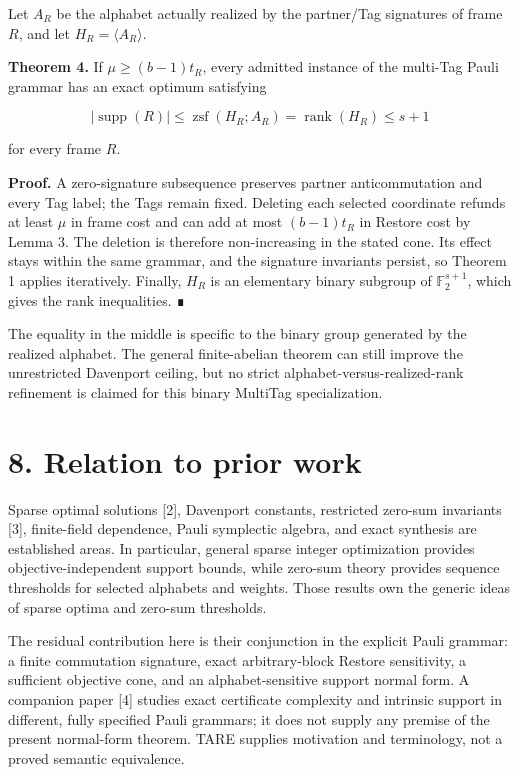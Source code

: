 \documentclass[
  11pt,
]{article}
\begin{document}
Let \(A_R\) be the alphabet actually realized by the partner/Tag
signatures of frame \(R\), and let \(H_R=\langle A_R\rangle\).

\textbf{Theorem 4.} If \(\mu\ge(b-1)t_R\), every admitted instance of
the multi-Tag Pauli grammar has an exact optimum satisfying

\[
|\operatorname{supp}(R)|
\le \operatorname{zsf}(H_R; A_R)
= \operatorname{rank}(H_R)
\le s+1
\]

for every frame \(R\).

\textbf{Proof.} A zero-signature subsequence preserves partner
anticommutation and every Tag label; the Tags remain fixed. Deleting
each selected coordinate refunds at least \(\mu\) in frame cost and can
add at most \((b-1)t_R\) in Restore cost by Lemma 3. The deletion is
therefore non-increasing in the stated cone. Its effect stays within the
same grammar, and the signature invariants persist, so Theorem 1 applies
iteratively. Finally, \(H_R\) is an elementary binary subgroup of
\(\mathbb F_2^{s+1}\), which gives the rank inequalities. ∎

The equality in the middle is specific to the binary group generated by
the realized alphabet. The general finite-abelian theorem can still
improve the unrestricted Davenport ceiling, but no strict
alphabet-versus-realized-rank refinement is claimed for this binary
MultiTag specialization.

\hypertarget{relation-to-prior-work}{%
\section{8. Relation to prior work}\label{relation-to-prior-work}}

Sparse optimal solutions {[}2{]}, Davenport constants, restricted
zero-sum invariants {[}3{]}, finite-field dependence, Pauli symplectic
algebra, and exact synthesis are established areas. In particular,
general sparse integer optimization provides objective-independent
support bounds, while zero-sum theory provides sequence thresholds for
selected alphabets and weights. Those results own the generic ideas of
sparse optima and zero-sum thresholds.

The residual contribution here is their conjunction in the explicit
Pauli grammar: a finite commutation signature, exact arbitrary-block
Restore sensitivity, a sufficient objective cone, and an
alphabet-sensitive support normal form. A companion paper {[}4{]}
studies exact certificate complexity and intrinsic support in different,
fully specified Pauli grammars; it does not supply any premise of the
present normal-form theorem. TARE supplies motivation and terminology,
not a proved semantic equivalence.
\end{document}
